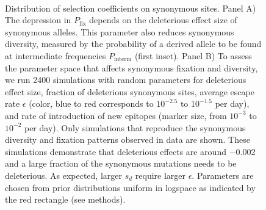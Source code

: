 \documentclass[rmp, twocolumn]{revtex4}
\newcommand{\pfix}{P_{\mathrm{fix}}}
\begin{document}
\begin{figure}
\begin{center}
\\
\caption{Distribution of selection coefficients on synonymous sites. Panel A)
The depression in $\pfix$ depends on the deleterious effect size 
of synonymous alleles. This parameter also reduces synonymous
diversity, measured by the probability of a derived allele to be found at
intermediate frequencies $P_\text{interm}$ (first inset).
Panel B) To assess the parameter space that affects synonymous fixation and
diversity, we run 2400 simulations with random parameters for deleterious effect
size, fraction of deleterious synonymous sites, average escape rate $\epsilon$
(color, blue to red corresponds to $10^{-2.5}$ to $10^{-1.5}$ per day), and rate of
introduction of new epitopes (marker size, from $10^{-3}$ to $10^{-2}$ per
day). Only simulations that reproduce the synonymous diversity and fixation
patterns observed in data are shown. These simulations demonstrate that
deleterious effects are around $-0.002$ and a large fraction of the 
synonymous mutations needs to be deleterious. As expected, larger
$s_d$ require larger $\epsilon$. Parameters are chosen
from prior distributions uniform in logspace as indicated by the red rectangle
(see methods).}
\label{fig:simheat}
\end{center}
\end{figure}
\end{document}
